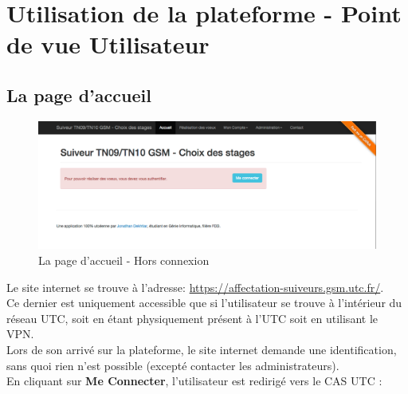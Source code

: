 \documentclass[a4paper,titlepage]{scrartcl}
\begin{document}
\clearpage


\section{Utilisation de la plateforme - Point de vue Utilisateur}

\subsection{La page d'accueil}

\begin{figure}[H]
	\vspace{-3mm}
	\begin{center}
		\includegraphics[scale=0.34]{Images/homepage_disconnected.png}
		\caption{La page d'accueil - Hors connexion}
	\end{center}
\end{figure}

Le site internet se trouve à l'adresse: \url{https://affectation-suiveurs.gsm.utc.fr/}.\\
Ce dernier est uniquement accessible que si l'utilisateur se trouve à l'intérieur du réseau UTC, soit en étant physiquement présent à l'UTC soit en utilisant le VPN.\\

Lors de son arrivé sur la plateforme, le site internet demande une identification, sans quoi rien n'est possible (excepté contacter les administrateurs).\\

En cliquant sur \textbf{Me Connecter}, l'utilisateur est redirigé vers le CAS UTC :\\
\end{document}
